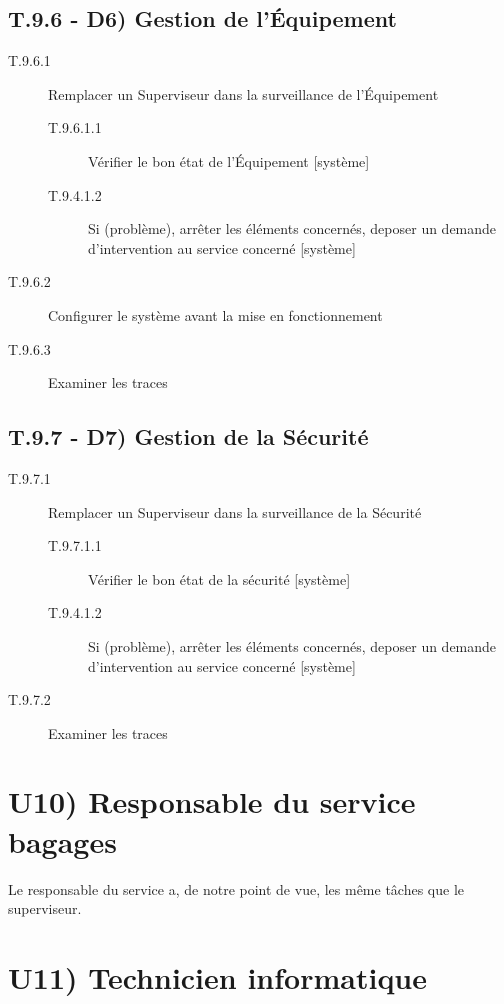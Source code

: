 	\subsection{T.9.6 - D6) Gestion de l'Équipement}
	\begin{description}
	\item[T.9.6.1] Remplacer un Superviseur dans la surveillance de l'Équipement
		\begin{description}
		\item[T.9.6.1.1] Vérifier le bon état de l'Équipement [système]
		\item[T.9.4.1.2] Si (problème), arrêter les éléments concernés, deposer un
		demande d'intervention au service concerné [système]
		\end{description}
	\item[T.9.6.2] Configurer le système avant la mise en fonctionnement

	\item[T.9.6.3] Examiner les traces
	\end{description}

	\subsection{T.9.7 - D7) Gestion de la Sécurité}
	\begin{description}
	\item[T.9.7.1] Remplacer un Superviseur dans la surveillance de la Sécurité
		\begin{description}
		\item[T.9.7.1.1] Vérifier le bon état de la sécurité [système]
		\item[T.9.4.1.2] Si (problème), arrêter les éléments concernés, deposer un
		demande d'intervention au service concerné [système]
		\end{description}
	\item[T.9.7.2] Examiner les traces
	\end{description}
	
\section{U10) Responsable du service bagages}

Le responsable du service a, de notre point de vue, les même tâches que le
superviseur.

\section{U11) Technicien informatique}
